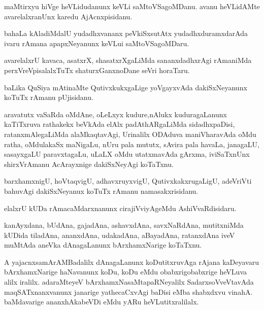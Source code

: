 \documentclass{article}
\begin{document}
\begin{mn}%
maMtirxyu hiVge heVLidudanunx keVLi saMtoVSagoMDanu. avanu heVLidAMte avarelalxranUnx 
karedu AjAcnxpisidanu.
\end{mn}

\begin{mn}%
bahaLa kAladiMdalU yudadhxvananx peVkiSxsutAtx yudadhxduramxdarAda ivaru rAmana 
apapxNeyanunx keVLui saMtoVSagoMDaru.
\end{mn}

\begin{mn}%
avarelalxrU kavaca, asatxrX, shasatxrXgaLiMda sananxdadhxrAgi rAmaniMda perxVreVpisalalxTuTx 
shaturxGanxnoDane seVri horaTaru.
\end{mn}

\begin{mn}%
baLika QuSiya mAtinaMte QutivxkukxgaLige yoVgayxvAda dakiSxNeyanunx koTuTx rAmanu pUjisidanu.
\end{mn}

\begin{mn}%
aravatutx vaSaRda oMdAne, oLeLxyx kudure,nAlukx kuduragaLanunx kaTiTxruva rathakekx beVkAda 
elAlx padAthARgaLiMda sidadhxpaDisi, ratanxmAlegaLiMda alaMkaqtavAgi, Urinalilx ODAduva 
maniVharavAda oMdu ratha, oMdulakaSx maNigaLu, nUru pala mututx, sAvira pala havaLa, 
janagaLU, sasayxgaLU paravxtagaLu, uLaLX oMdu utatxmavAda gArxma, iviSaTxnUnx shirxVrAmanu 
AcArayxnige dakiSxNeyAgi koTaTxnu.
\end{mn}

\begin{mn}%
barxhamxnigU, hoVtaqvigU, adhavxruyxvigU, QutivxkakxrugaLigU, adeVriVti bahuvAgi 
dakiSxNeyanux koTuTx rAmanu namasakxrisidanu.
\end{mn}

\begin{mn}%
elalxrU kUDa rAmacaMdarxnanunx cirajiVviyAgeMdu AshiVvaRdisidaru.
\end{mn}

\begin{mn}%
kanAyxdana, bUdAna, gajadAna, ashavxdAna, savxNaRdAna, mutitxniMda kUDida tiladAna, 
ananxdAna, udakadAna, aBayadAna, ratanxdAna iveV muMtAda aneVka dAnagaLanunx 
bArxhamxNarige koTaTxnu.
\end{mn}

\begin{mn}%
A yajacnxsamArAMBadalilx dAnagaLanunx koDutitxruvAga rAjana kaDeyavaru bArxhamxNarige 
haNavanunx koDu, koDu eMdu obabxrigobabxrige heVLuva alilx iralilx. adaraMteyeV 
bArxhamxNasaMtapaRNeyalilx SadarxsoVveVtavAda maqSATxnanxvanunx janarige yathecaCxvAgi 
baDisi eMba shabxdxvu vinahA. baMdavarige ananxhAkabeVDi eMdu yARu heVLutitxralilalx.
\end{mn}
\end{document}
